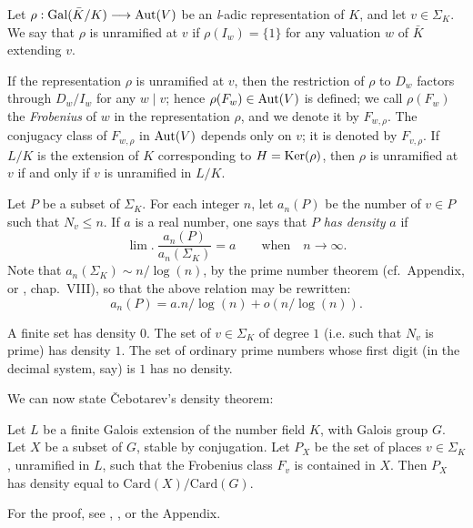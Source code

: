\begin{dfn}
Let $\rho : \mathrm{Gal}(\bar{K}/K) \longrightarrow \mathrm{Aut}(V)$ be an
\textit{l}-adic representation of $K$, and let $v \in \Sigma_K$.  We
say that $\rho$ is unramified at $v$ if $\rho(I_w) = \{1\}$ for any
valuation $w$ of $\bar{K}$ extending $v$.
\end{dfn}

If the representation $\rho$ is unramified at $v$, then the
restriction of $\rho$ to $D_w$ factors through $D_w/I_w$ for any
$w \mid v$; hence $\rho(F_w) \in \mathrm{Aut}(V)$ is defined; we call
$\rho(F_w)$ the \emph{Frobenius} of $w$ in the representation $\rho$,
and we denote it by $F_{w,\rho}$.  The conjugacy class of $F_{w,\rho}$
in $\mathrm{Aut}(V)$ depends only on $v$; it is denoted by $F_{v,\rho}$.  If
$L/K$ is the extension of $K$ corresponding to $H = \mathrm{Ker}(\rho)$, then
$\rho$ is unramified at $v$ if and only if $v$ is unramified in $L/K$.


Let $P$ be a subset of $\Sigma_K$.  For each integer $n$, let
$a_n(P)$ be the number of $v \in P$ such that $N_v \leq n$.  If $a$ is
a real number, one says that $P$ \emph{has density} $a$ if
\[
\lim.\ \frac{a_n(P)}{a_n(\Sigma_K)} = a
\qquad\text{when}\quad n \longrightarrow \infty.
\]
Note that $a_n(\Sigma_K) \sim n/\log(n)$, by the prime number theorem
(cf.~Appendix, or \cite{lang-algnum}, chap.~VIII), so that the above
relation may be rewritten:
\[
a_n(P) = a.n/\log(n) + o(n/\log(n)).
\]

\begin{examples}
A finite set has density $0$.  The set of $v \in \Sigma_K$ of degree
$1$ (i.e. such that $N_v$ is prime) has density $1$.  The set of
ordinary prime numbers whose first digit (in the decimal system, say)
is $1$ has no density.
\end{examples}

We can now state \v{C}ebotarev's density theorem:

\begin{theorem}
Let $L$ be a finite Galois extension of the number field $K$, with
Galois group $G$.  Let $X$ be a subset of $G$, stable by conjugation.
Let $P_X$ be the set of places $v \in \Sigma_K$, unramified in $L$,
such that the Frobenius class $F_v$ is contained in $X$.  Then $P_X$
has density equal to $\mathrm{Card}(X)/\mathrm{Card}(G)$.
\end{theorem}

For the proof, see \cite{cebotarev}, \cite{artin-collected}, or the
Appendix.

